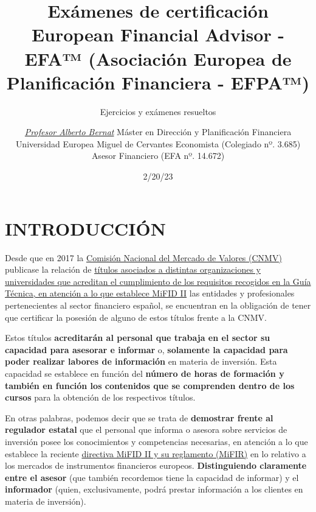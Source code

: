 \documentclass[
  letterpaper,
  DIV=11,
  numbers=noendperiod]{scrreprt}
\title{Exámenes de certificación European Financial Advisor - EFA™
(Asociación Europea de Planificación Financiera - EFPA™)}
\subtitle{Ejercicios y exámenes resueltos}
\author{\href{https://www.linkedin.com/in/albertobernat/}{\emph{Profesor
Alberto Bernat}} Máster en Dirección y Planificación Financiera
Universidad Europea Miguel de Cervantes Economista (Colegiado nº. 3.685)
Asesor Financiero (EFA nº. 14.672)}
\date{2/20/23}
\renewcommand*\contentsname{Table of contents}
\newcommand\contentsname{Table of contents}
\begin{document}
\maketitle
\ifdefined\Shaded\renewenvironment{Shaded}{\begin{tcolorbox}[sharp corners, interior hidden, borderline west={3pt}{0pt}{shadecolor}, frame hidden, breakable, boxrule=0pt, enhanced]}{\end{tcolorbox}}\fi

\renewcommand*\contentsname{Table of contents}
{
\hypersetup{linkcolor=}
\setcounter{tocdepth}{2}
\tableofcontents
}

\hypertarget{introducciuxf3n}{%
\chapter*{INTRODUCCIÓN}\label{introducciuxf3n}}


Desde que en 2017 la
\href{https://www.cnmv.es/portal/home.aspx}{Comisión Nacional del
Mercado de Valores (CNMV)} publicase la relación de
\href{http://cnmv.es/Docportal/Legislacion/Titulos/ListadoTitulos.pdf}{títulos
asociados a distintas organizaciones y universidades que acreditan el
cumplimiento de los requisitos recogidos en la Guía Técnica, en atención
a lo que establece MiFID II} las entidades y profesionales
pertenecientes al sector financiero español, se encuentran en la
obligación de tener que certificar la posesión de alguno de estos
títulos frente a la CNMV.

Estos títulos \textbf{acreditarán al personal que trabaja en el sector
su capacidad para asesorar e informar} o, \textbf{solamente la capacidad
para poder realizar labores de información} en materia de inversión.
Esta capacidad se establece en función del \textbf{número de horas de
formación y también en función los contenidos que se comprenden dentro
de los cursos} para la obtención de los respectivos títulos.

En otras palabras, podemos decir que se trata de \textbf{demostrar
frente al regulador estatal} que el personal que informa o asesora sobre
servicios de inversión posee los conocimientos y competencias
necesarias, en atención a lo que establece la reciente
\href{http://cnmv.es/portal/MIFIDII_MIFIR/MapaMiFID.aspx}{directiva
MiFID II y su reglamento (MiFIR)} en lo relativo a los mercados de
instrumentos financieros europeos. \textbf{Distinguiendo claramente
entre el asesor} (que también recordemos tiene la capacidad de informar)
y el \textbf{informador} (quien, exclusivamente, podrá prestar
información a los clientes en materia de inversión).
\end{document}
